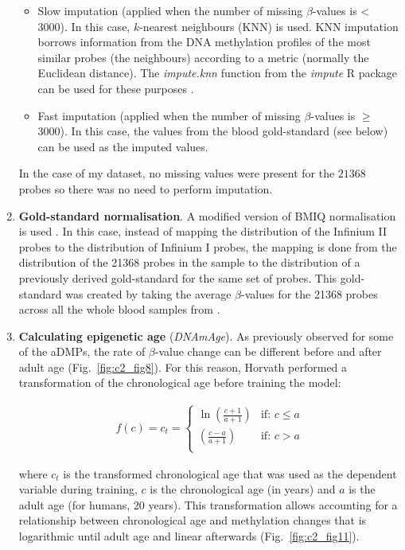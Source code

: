 \begin{enumerate}
\begin{itemize}
		\item Slow imputation (applied when the number of missing $\beta$-values is < 3000). In this case, $k$-nearest neighbours (\acrshort{KNN}) is used. KNN imputation borrows information from the DNA methylation profiles of the most similar probes (the neighbours) according to a metric (normally the Euclidean distance). The \textit{impute.knn} function from the \textit{impute} R package can be used for these purposes \citep{Troyanskaya2001}.
		
		\item Fast imputation (applied when the number of missing $\beta$-values is $\geq$ 3000). In this case, the values from the blood gold-standard (see below) can be used as the imputed values.
		
	\end{itemize}
	
	In the case of my dataset, no missing values were present for the $21368$ probes so there was no need to perform imputation.
	
	\item \textbf{Gold-standard normalisation}. A modified version of BMIQ normalisation is used \citep{Teschendorff2012}. In this case, instead of mapping the distribution of the Infinium II probes to the distribution of Infinium I probes, the mapping is done from the distribution of the 21368 probes in the sample to the distribution of a previously derived gold-standard for the same set of probes. This gold-standard was created by taking the average $\beta$-values for the 21368 probes across all the whole blood samples from \citep{Horvath2012}.
	
	\item \textbf{Calculating epigenetic age} (\textit{DNAmAge}). As previously observed for some of the aDMPs, the rate of $\beta$-value change can be different before and after adult age (Fig.~\ref{fig:c2_fig8}). For this reason, Horvath performed a transformation of the chronological age before training the model:
	
	\begin{align}
	f(c) = c_t =  
	\begin{cases}
	\ln\left(\frac{c+1}{a+1}\right) &\text{if: } c\leq a \\
	\left(\frac{c-a}{a+1}\right) &\text{if: } c>a \\
	\end{cases}
	\end{align} 
	
	where $c_t$ is the transformed chronological age that was used as the dependent variable during training, $c$ is the chronological age (in years) and $a$ is the adult age (for humans, 20 years). This transformation allows accounting for a relationship between chronological age and methylation changes that is logarithmic until adult age and linear afterwards (Fig.~\ref{fig:c2_fig11}). 
	

\end{enumerate}
